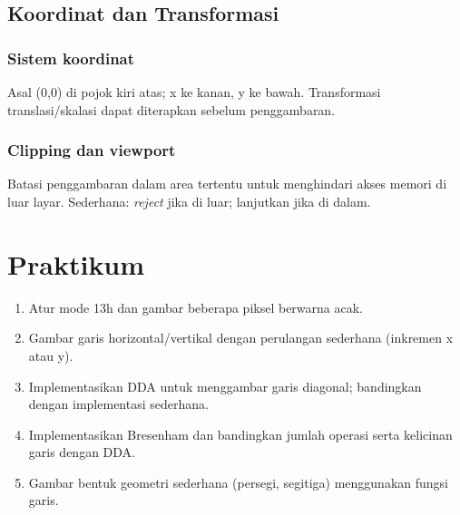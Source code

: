 \subsection{Koordinat dan Transformasi}
\subsubsection{Sistem koordinat}
Asal (0,0) di pojok kiri atas; x ke kanan, y ke bawah. Transformasi translasi/skalasi dapat diterapkan sebelum penggambaran.

\subsubsection{Clipping dan viewport}
Batasi penggambaran dalam area tertentu untuk menghindari akses memori di luar layar. Sederhana: \textit{reject} jika di luar; lanjutkan jika di dalam.

\section{Praktikum}
\begin{enumerate}
  \item Atur mode 13h dan gambar beberapa piksel berwarna acak.
  \item Gambar garis horizontal/vertikal dengan perulangan sederhana (inkremen x atau y).
  \item Implementasikan DDA untuk menggambar garis diagonal; bandingkan dengan implementasi sederhana.
  \item Implementasikan Bresenham dan bandingkan jumlah operasi serta kelicinan garis dengan DDA.
  \item Gambar bentuk geometri sederhana (persegi, segitiga) menggunakan fungsi garis.
\end{enumerate}

